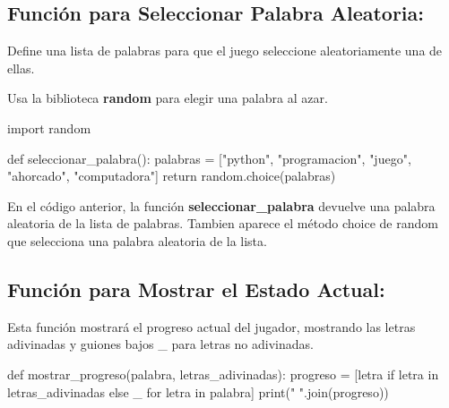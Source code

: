 \documentclass[
  a4paper,
  DIV=11,
  numbers=noendperiod,
  onepage,
  openany]{scrreprt}
\newenvironment{Shaded}{\begin{snugshade}}{\end{snugshade}}
\newcommand{\BuiltInTok}[1]{\textcolor[rgb]{0.00,0.23,0.31}{#1}}
\newcommand{\ControlFlowTok}[1]{\textcolor[rgb]{0.00,0.23,0.31}{#1}}
\newcommand{\ImportTok}[1]{\textcolor[rgb]{0.00,0.46,0.62}{#1}}
\newcommand{\KeywordTok}[1]{\textcolor[rgb]{0.00,0.23,0.31}{#1}}
\newcommand{\NormalTok}[1]{\textcolor[rgb]{0.00,0.23,0.31}{#1}}
\newcommand{\OperatorTok}[1]{\textcolor[rgb]{0.37,0.37,0.37}{#1}}
\newcommand{\StringTok}[1]{\textcolor[rgb]{0.13,0.47,0.30}{#1}}
\begin{document}
\subsection{Función para Seleccionar Palabra
Aleatoria:}\label{funciuxf3n-para-seleccionar-palabra-aleatoria}

Define una lista de palabras para que el juego seleccione aleatoriamente
una de ellas.

Usa la biblioteca \textbf{random} para elegir una palabra al azar.

\begin{Shaded}
\begin{Highlighting}[]
\ImportTok{import}\NormalTok{ random}

\KeywordTok{def}\NormalTok{ seleccionar\_palabra():}
\NormalTok{    palabras }\OperatorTok{=}\NormalTok{ [}\StringTok{"python"}\NormalTok{, }\StringTok{"programacion"}\NormalTok{, }\StringTok{"juego"}\NormalTok{, }\StringTok{"ahorcado"}\NormalTok{, }\StringTok{"computadora"}\NormalTok{]}
    \ControlFlowTok{return}\NormalTok{ random.choice(palabras)}
\end{Highlighting}
\end{Shaded}

En el código anterior, la función \textbf{seleccionar\_palabra} devuelve
una palabra aleatoria de la lista de palabras. Tambien aparece el método
choice de random que selecciona una palabra aleatoria de la lista.

\subsection{Función para Mostrar el Estado
Actual:}\label{funciuxf3n-para-mostrar-el-estado-actual}

Esta función mostrará el progreso actual del jugador, mostrando las
letras adivinadas y guiones bajos \_ para letras no adivinadas.

\begin{Shaded}
\begin{Highlighting}[]
\KeywordTok{def}\NormalTok{ mostrar\_progreso(palabra, letras\_adivinadas):}
\NormalTok{    progreso }\OperatorTok{=}\NormalTok{ [letra }\ControlFlowTok{if}\NormalTok{ letra }\KeywordTok{in}\NormalTok{ letras\_adivinadas }\ControlFlowTok{else} \StringTok{\textquotesingle{}\_\textquotesingle{}} \ControlFlowTok{for}\NormalTok{ letra }\KeywordTok{in}\NormalTok{ palabra]}
    \BuiltInTok{print}\NormalTok{(}\StringTok{" "}\NormalTok{.join(progreso))}
\end{Highlighting}
\end{Shaded}
\end{document}
